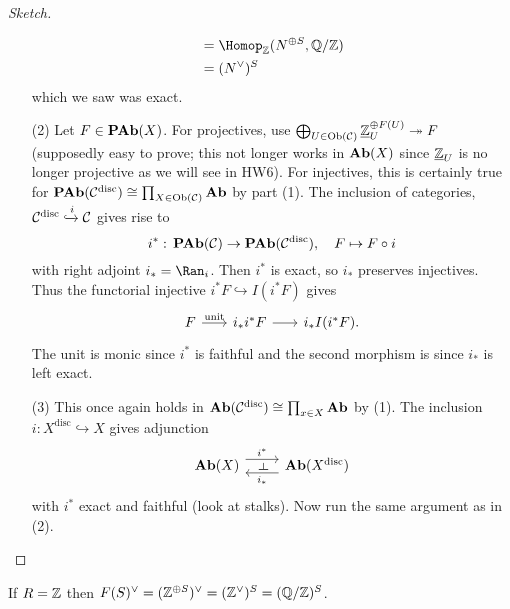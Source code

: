 \documentclass[../main.tex]{subfiles}
\begin{document}
\begin{proof}[Sketch]
\begin{enumerate}
\begin{align*}
            &= \Hom[\bb Z](N^{\oplus S}, \bb Q / \bb Z) \\ 
            &= (N^\vee)^S
        \end{align*}
        which we saw was exact.
        \item[(2)] Let $F\in \operatorname{\mathbf{PAb}}(X)$. For projectives, use $\bigoplus_{U\in \operatorname{Ob}(\mathcal{C})} \underline{\mathbb{Z}}_U^{\oplus F(U)} \twoheadrightarrow F$ (supposedly easy to prove; this not longer works in $\mathbf{Ab}(X)$ since $\underline{\mathbb{Z}}_U$ is no longer projective as we will see in HW6). For injectives, this is certainly true for $\operatorname{\mathbf{PAb}}(\mathcal{C}^{\text{disc}}) \cong \prod_{X\in \operatorname{Ob}(\mathcal{C})} \mathbf{Ab}$ by part (1). The inclusion of categories, $\mathcal{C}^{\text{disc}} \xhookrightarrow{i} \mathcal{C}$ gives rise to
        \[i^*\colon \catAbelianPresheaf(\cat C) \to \catAbelianPresheaf(\cat C^{\text{disc}}),\quad F\mapsto F\circ i\] with right adjoint $i_* = \Ran_i$.  Then $i^*$ is exact, so $i_*$ preserves injectives. Thus the functorial injective $i^* F\hookrightarrow I(i^* F)$ gives
        \[\begin{tikzcd}[column sep=scriptsize]
            F \ar[r, "\text{unit}"] & i_*i^* F \ar[r] & i_* I(i^* F).
        \end{tikzcd}\]
        The unit is monic since $i^*$ is faithful and the second morphism is since $i_*$ is left exact.
        \item[(3)] This once again holds in $\mathbf{Ab}(\mathcal{C}^{\text{disc}}) \cong \prod_{x\in X} \mathbf{Ab}$ by (1). The inclusion $i\colon X^{\text{disc}}\hookrightarrow X$ gives adjunction
        \begin{equation*}
          \begin{tikzcd}
            \catAbelianGroup(X) \ar[r, "i^*"{name=leftadj}, shift left=2] & \catAbelianGroup(X^{\text{disc}}) \ar[l, "i_*"{name=rightadj}, shift left=2]
            \ar[from=leftadj, to=rightadj, phantom, "\leftadj" marking]
          \end{tikzcd}
        \end{equation*}
        with $i^*$ exact and faithful (look at stalks). Now run the same argument as in (2).\qedhere
    \end{enumerate}
\end{proof}

\begin{exmp}
    If $R = \mathbb{Z}$ then $F(S)^\vee = (\mathbb{Z}^{\oplus S})^\vee = (\mathbb{Z}^\vee)^S = (\mathbb{Q}/ \mathbb{Z})^S$.
\end{exmp}
\end{document}
